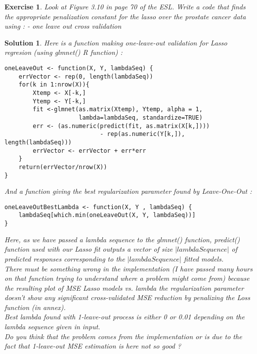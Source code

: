 \documentclass[12pt,a4paper]{article}
\newtheorem{exercise}{Exercise}
\newtheorem{solution}{Solution}
\begin{document}
\begin{exercise}
Look at Figure 3.10 in page 70 of the ESL. Write a code that finds the appropriate penalization constant for the lasso over the prostate cancer data using :
- one leave out cross validation
\end{exercise}
\begin{solution}
Here is a function making one-leave-out validation for Lasso regresion (using glmnet() R function) : 
\begin{verbatim}
oneLeaveOut <- function(X, Y, lambdaSeq) {
    errVector <- rep(0, length(lambdaSeq))
    for(k in 1:nrow(X)){
        Xtemp <- X[-k,]
        Ytemp <- Y[-k,]
        fit <-glmnet(as.matrix(Xtemp), Ytemp, alpha = 1,
                     lambda=lambdaSeq, standardize=TRUE)
        err <- (as.numeric(predict(fit, as.matrix(X[k,]))) 
                           - rep(as.numeric(Y[k,]), length(lambdaSeq)))
        errVector <- errVector + err*err
    }
    return(errVector/nrow(X))
}
\end{verbatim}

And a function giving the best regularization parameter found by Leave-One-Out : 
\begin{verbatim}
oneLeaveOutBestLambda <- function(X, Y , lambdaSeq) {
    lambdaSeq[which.min(oneLeaveOut(X, Y, lambdaSeq))]
}
\end{verbatim}

Here, as we have passed a lambda sequence to the glmnet() function, predict() function used with our Lasso fit outputs a vector of size $\vert lambdaSequence \vert$ of predicted responses corresponding to the $\vert lambdaSequence \vert$ fitted models.\\

There must be something wrong in the implementation (I have passed many hours on that function trying to understand where a problem might come from) because the resulting plot of MSE Lasso models vs. lambda the regularization parameter doesn't show any significant cross-validated MSE reduction by penalizing the Loss function (in annex).\\

Best lambda found with 1-leave-out process is either 0 or 0.01 depending on the lambda sequence given in input.\\

Do you think that the problem comes from the implementation or is due to the fact that 1-leave-out MSE estimation is here not so good ?
\end{solution}
\end{document}
